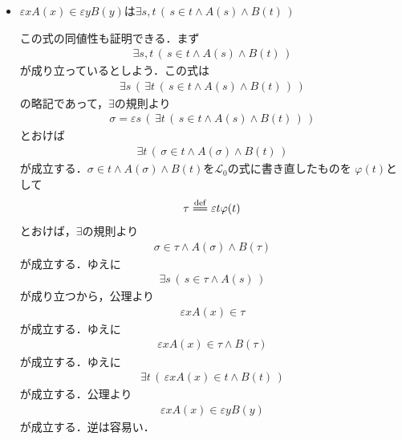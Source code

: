 \begin{itemize}
		\item $\varepsilon x A(x) \in \varepsilon y B(y)$は$\exists s,t\, \left(\, s \in t \wedge A(s) \wedge B(t)\, \right)$
		
			この式の同値性も証明できる．まず
			\begin{align}
				\exists s,t\, \left(\, s \in t \wedge A(s) \wedge B(t)\, \right)
			\end{align}
			が成り立っているとしよう．この式は
			\begin{align}
				\exists s\, \left(\, \exists t\, \left(\, s \in t \wedge A(s) \wedge B(t)\, \right)\, \right)
			\end{align}
			の略記であって，$\exists$の規則より
			\begin{align}
				\sigma = \varepsilon s\, \left(\, \exists t\, \left(\, s \in t \wedge A(s) \wedge B(t)\, \right)\, \right)
			\end{align}
			とおけば
			\begin{align}
				\exists t\, \left(\, \sigma \in t \wedge A(\sigma) \wedge B(t)\, \right)
			\end{align}
			が成立する．$\sigma \in t \wedge A(\sigma) \wedge B(t)$を$\mathcal{L}_{0}$の式に書き直したものを
			$\varphi(t)$として
			\begin{align}
				\tau \defeq \varepsilon t \varphi(t)
			\end{align}
			とおけば，$\exists$の規則より
			\begin{align}
				\sigma \in \tau \wedge A(\sigma) \wedge B(\tau)
			\end{align}
			が成立する．ゆえに
			\begin{align}
				\exists s\, \left(\, s \in \tau \wedge A(s)\, \right)
			\end{align}
			が成り立つから，公理より
			\begin{align}
				\varepsilon x A(x) \in \tau
			\end{align}
			が成立する．ゆえに
			\begin{align}
				\varepsilon x A(x) \in \tau \wedge B(\tau)
			\end{align}
			が成立する．ゆえに
			\begin{align}
				\exists t\, \left(\, \varepsilon x A(x) \in t \wedge B(t)\, \right)
			\end{align}
			が成立する．公理より
			\begin{align}
				\varepsilon x A(x) \in \varepsilon y B(y)
			\end{align}
			が成立する．逆は容易い．
			\begin{align}

\end{align}
\end{itemize}
